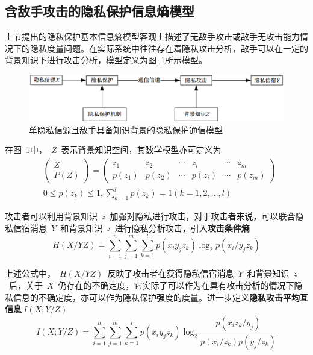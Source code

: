 \subsection{含敌手攻击的隐私保护信息熵模型}\label{subsec:privacy-preserving-attack}

上节提出的隐私保护基本信息熵模型客观上描述了无敌手攻击或敌手无攻击能力情况下的隐私度量问题。在实际系统中往往存在着隐私攻击分析，敌手可以在一定的背景知识下进行攻击分析，模型定义为图~\ref{fig:Communication-Model-for-Privacy-of-Single}所示模型。
\begin{figure}[htbp]
	\centering
	\includegraphics[width = 0.95\linewidth]{./figures/Communication-Model-for-Privacy-of-Single.png}
	\caption{单隐私信源且敌手具备知识背景的隐私保护通信模型}
	\label{fig:Communication-Model-for-Privacy-of-Single}
\end{figure}

在图~\ref{fig:Communication-Model-for-Privacy-of-Single}中，~$Z$~表示背景知识空间，其数学模型亦可定义为
\begin{equation}
\begin{split}
&\begin{pmatrix}
Z\\ 
P(Z)
\end{pmatrix}=\begin{pmatrix}
z_{1} & z_{2} & \cdots  & z_{i} & \cdots  & z_{m}\\ 
p(z_{1})& p(z_{2}) & \cdots & p(z_{i}) & \cdots & p(z_{m})
\end{pmatrix} \\
&0 \leqslant p(z_{k})\leqslant 1,\sum_{k=1}^{l}p(z_{k})=1(k=1,2,...,l)
\end{split}
\end{equation}

攻击者可以利用背景知识~$z$~加强对隐私进行攻击，对于攻击者来说，可以联合隐私信宿消息~$Y$~和背景知识~$z$~进行隐私分析攻击，引入\textbf{攻击条件熵}
\begin{equation}
H(X/YZ)=\sum_{i=1}^{n}\sum_{j=1}^{m}\sum_{k=1}^{l}p(x_{i}y_{j}z_{k})\log_{2}p(x_{i}/y_{j}z_{k})
\end{equation}

上述公式中，~$H(X/YZ)$~反映了攻击者在获得隐私信宿消息~$Y$~和背景知识~$z$~后，关于~$X$~仍存在的不确定度，它实际了可以作为在具有攻击分析的情况下隐私信息的不确定度，亦可以作为隐私保护强度的度量。进一步定义\textbf{隐私攻击平均互信息}$~I(X;Y/Z)$~
\begin{equation}
I(X;Y/Z)=\sum_{i=1}^{n}\sum_{j=1}^{m}\sum_{k=1}^{l}p(x_{i}y_{j}z_{k})\log_{2}\frac{p(x_{i}z_{k}/y_{j})}{p(x_{i}/z_{k})p(y_{j}/z_{k})}
\end{equation}

